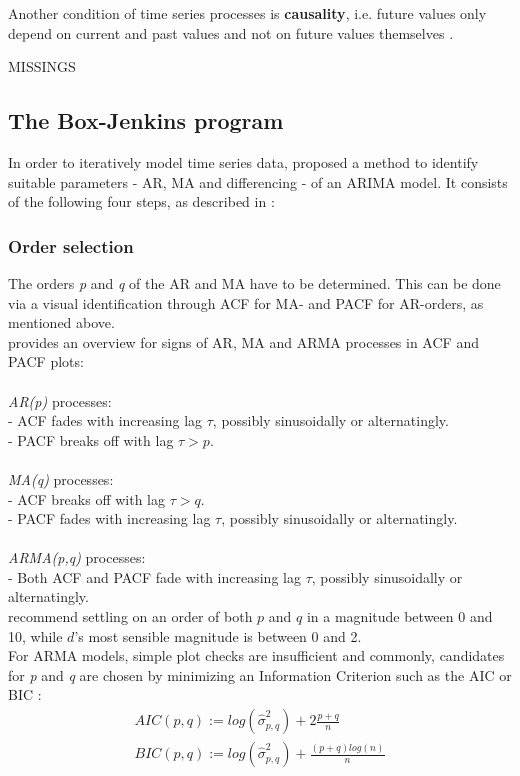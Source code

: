 \documentclass[a4paper, 11pt]{article}
\begin{document}
Another condition of time series processes is \textbf{causality}, i.e. future values only depend on current and past values and not on future values themselves \citep{Vogel.2015}.

MISSINGS

\subsection{The Box-Jenkins program}
In order to iteratively model time series data, \citep{Box.1976} proposed a method to identify suitable parameters - AR, MA and differencing - of an ARIMA model. It consists of the following four steps, as described in \cite{Falk.2012}: \\
\subsubsection{Order selection}
The orders \textit{p} and \textit{q} of the AR and MA have to be determined. This can be done via a visual identification through ACF for MA- and PACF for AR-orders, as mentioned above. \\
\cite{Vogel.2015} provides an overview for signs of AR, MA and ARMA processes in ACF and PACF plots: \\
\\
\textit{AR(p)} processes:\\
- ACF fades with increasing lag $\tau$, possibly sinusoidally or alternatingly.\\
- PACF breaks off with lag $\tau > p$.\\
\\
\textit{MA(q)} processes:\\
- ACF breaks off with lag $\tau > q$.\\
- PACF fades with increasing lag $\tau$, possibly sinusoidally or alternatingly.\\
\\
\textit{ARMA(p,q)} processes: \\
- Both ACF and PACF fade with increasing lag $\tau$, possibly sinusoidally or alternatingly.\\


\cite{Zhou.2006} recommend settling on an order of both $p$ and $q$ in a magnitude between 0 and 10, while $d$'s most sensible magnitude is between 0 and 2.\\
For ARMA models, simple plot checks are insufficient and commonly, candidates for \textit{p} and \textit{q} are chosen by minimizing an Information Criterion such as 
the AIC or BIC \citep{Falk.2012}:
\begin{align}
	AIC(p,q) := log(\hat{\sigma}^{2}_{p,q}) + 2 \frac{p + q}{n}\\
	BIC(p,q) := log(\hat{\sigma}^{2}_{p,q}) +  \frac{(p + q)log(n)}{n}\\
\end{align}
\end{document}
